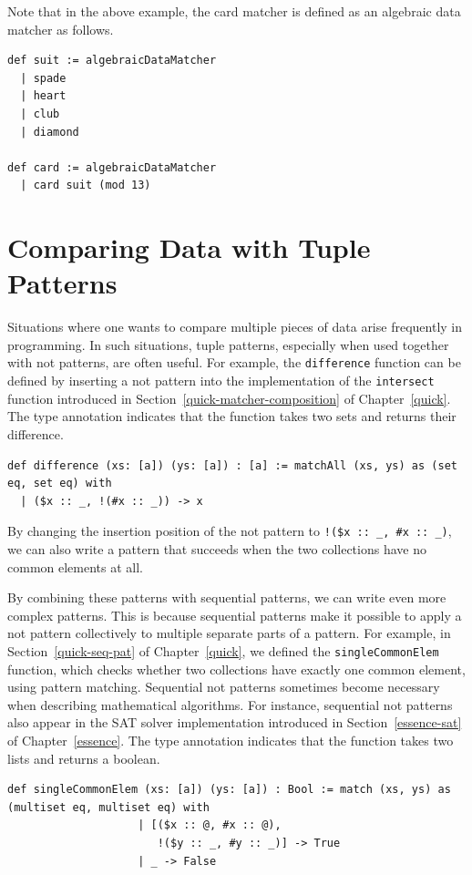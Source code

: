 Note that in the above example, the card matcher is defined as an algebraic data matcher as follows.
\begin{lstlisting}[language=egison,numbers=none]
def suit := algebraicDataMatcher
  | spade
  | heart
  | club
  | diamond

def card := algebraicDataMatcher
  | card suit (mod 13)
\end{lstlisting}

\section{Comparing Data with Tuple Patterns}\label{pmo-tuple}

Situations where one wants to compare multiple pieces of data arise frequently in programming.
In such situations, tuple patterns, especially when used together with not patterns, are often useful.
For example, the \lstinline{difference} function can be defined by inserting a not pattern into the implementation of the \lstinline{intersect} function introduced in Section~\ref{quick-matcher-composition} of Chapter~\ref{quick}.
The type annotation indicates that the function takes two sets and returns their difference.
\begin{lstlisting}[language=egison,numbers=none]
def difference (xs: [a]) (ys: [a]) : [a] := matchAll (xs, ys) as (set eq, set eq) with
  | ($x :: _, !(#x :: _)) -> x
\end{lstlisting}
By changing the insertion position of the not pattern to \lstinline|!($x :: _, #x :: _)|, we can also write a pattern that succeeds when the two collections have no common elements at all.

By combining these patterns with sequential patterns, we can write even more complex patterns.
This is because sequential patterns make it possible to apply a not pattern collectively to multiple separate parts of a pattern.
For example, in Section~\ref{quick-seq-pat} of Chapter~\ref{quick}, we defined the \lstinline{singleCommonElem} function, which checks whether two collections have exactly one common element, using pattern matching.
Sequential not patterns sometimes become necessary when describing mathematical algorithms.
For instance, sequential not patterns also appear in the SAT solver implementation introduced in Section~\ref{essence-sat} of Chapter~\ref{essence}.
The type annotation indicates that the function takes two lists and returns a boolean.
\begin{lstlisting}[language=egison,numbers=none]
def singleCommonElem (xs: [a]) (ys: [a]) : Bool := match (xs, ys) as (multiset eq, multiset eq) with
                    | [($x :: @, #x :: @),
                       !($y :: _, #y :: _)] -> True
                    | _ -> False
\end{lstlisting}

